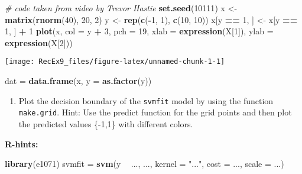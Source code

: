 \documentclass[]{article}
\newenvironment{Shaded}{\begin{snugshade}}{\end{snugshade}}
\newcommand{\CommentTok}[1]{\textcolor[rgb]{0.56,0.35,0.01}{\textit{#1}}}
\newcommand{\DataTypeTok}[1]{\textcolor[rgb]{0.13,0.29,0.53}{#1}}
\newcommand{\DecValTok}[1]{\textcolor[rgb]{0.00,0.00,0.81}{#1}}
\newcommand{\KeywordTok}[1]{\textcolor[rgb]{0.13,0.29,0.53}{\textbf{#1}}}
\newcommand{\NormalTok}[1]{#1}
\newcommand{\OperatorTok}[1]{\textcolor[rgb]{0.81,0.36,0.00}{\textbf{#1}}}
\newcommand{\StringTok}[1]{\textcolor[rgb]{0.31,0.60,0.02}{#1}}
\providecommand{\tightlist}{%
  \setlength{\itemsep}{0pt}\setlength{\parskip}{0pt}}
\begin{document}
\begin{Shaded}
\begin{Highlighting}[]
\CommentTok{# code taken from video by Trevor Hastie}
\KeywordTok{set.seed}\NormalTok{(}\DecValTok{10111}\NormalTok{)}
\NormalTok{x <-}\StringTok{ }\KeywordTok{matrix}\NormalTok{(}\KeywordTok{rnorm}\NormalTok{(}\DecValTok{40}\NormalTok{), }\DecValTok{20}\NormalTok{, }\DecValTok{2}\NormalTok{)}
\NormalTok{y <-}\StringTok{ }\KeywordTok{rep}\NormalTok{(}\KeywordTok{c}\NormalTok{(}\OperatorTok{-}\DecValTok{1}\NormalTok{, }\DecValTok{1}\NormalTok{), }\KeywordTok{c}\NormalTok{(}\DecValTok{10}\NormalTok{, }\DecValTok{10}\NormalTok{))}
\NormalTok{x[y }\OperatorTok{==}\StringTok{ }\DecValTok{1}\NormalTok{, ] <-}\StringTok{ }\NormalTok{x[y }\OperatorTok{==}\StringTok{ }\DecValTok{1}\NormalTok{, ] }\OperatorTok{+}\StringTok{ }\DecValTok{1}
\KeywordTok{plot}\NormalTok{(x, }\DataTypeTok{col =}\NormalTok{ y }\OperatorTok{+}\StringTok{ }\DecValTok{3}\NormalTok{, }\DataTypeTok{pch =} \DecValTok{19}\NormalTok{, }\DataTypeTok{xlab =} \KeywordTok{expression}\NormalTok{(X[}\DecValTok{1}\NormalTok{]), }\DataTypeTok{ylab =} \KeywordTok{expression}\NormalTok{(X[}\DecValTok{2}\NormalTok{]))}
\end{Highlighting}
\end{Shaded}

\texttt{[image: RecEx9\_files/figure-latex/unnamed-chunk-1-1]}

\begin{Shaded}
\begin{Highlighting}[]
\NormalTok{dat =}\StringTok{ }\KeywordTok{data.frame}\NormalTok{(x, }\DataTypeTok{y =} \KeywordTok{as.factor}\NormalTok{(y))}
\end{Highlighting}
\end{Shaded}

\begin{enumerate}
\def\labelenumi{(\alph{enumi})}
\tightlist
\item
  Plot the decision boundary of the \texttt{svmfit} model by using the
  function \texttt{make.grid}. Hint: Use the predict function for the
  grid points and then plot the predicted values \{-1,1\} with different
  colors.
\end{enumerate}

\textbf{R-hints:}

\begin{Shaded}
\begin{Highlighting}[]
\KeywordTok{library}\NormalTok{(e1071)}
\NormalTok{svmfit =}\StringTok{ }\KeywordTok{svm}\NormalTok{(y }\OperatorTok{~}\StringTok{ }\NormalTok{..., ..., }\DataTypeTok{kernel =} \StringTok{"..."}\NormalTok{, }\DataTypeTok{cost =}\NormalTok{ ..., }\DataTypeTok{scale =}\NormalTok{ ...)}
\end{Highlighting}
\end{Shaded}
\end{document}

